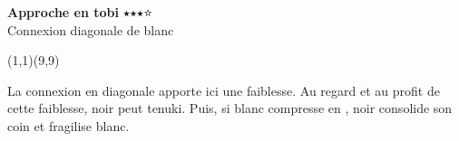 \documentclass[preview, border=0pt, varwidth=false]{standalone}
\begin{document}
	\setgounit{0.4cm} 
	
\parbox[c][14.65cm][c]{10.2cm}{
	\centering
	
	{\Large\textbf{Approche en tobi} $\medblackstar \medblackstar \medblackstar \medwhitestar$ \\ Connexion diagonale de blanc}
	\vspace{3em}
	
	\begin{psgopartialboard}{(1,1)(9,9)}
		\pass
		\pass
	\end{psgopartialboard}
	
	\vspace{1em}
	La connexion en diagonale  apporte ici une faiblesse. Au regard et au profit de cette faiblesse, noir peut tenuki. Puis, si blanc compresse en , noir consolide son coin et fragilise blanc. 
}
\end{document}
